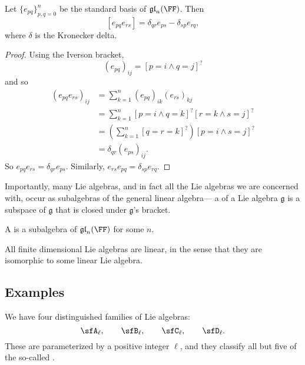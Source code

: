 \documentclass{article}
\newcommand{\lb}[1]{\ensuremath{\left[{#1}\right]}}
\newcommand{\iverson}[1]{\ensuremath{\left[{#1}\right]^?}}
\newcommand{\frkg}{{\ensuremath{\mathfrak{g}}}}
\newcommand{\glalg}{\ensuremath{\mathfrak{gl}}}
\begin{document}
\begin{proposition}
    Let $\{e_{pq}\}_{p,q = 0}^n$ be the standard basis of $\glalg_n(\FF)$.
    Then
    \[
        \lb{e_{pq}e_{rs}}
        =
        \delta_{qr}e_{ps}
        -
        \delta_{sp}e_{rq},
    \]
    where $\delta$ is the Kronecker delta.
\end{proposition}

\begin{proof}
    Using the Iverson bracket,
    \[
        (e_{pq})_{ij}
        =
        \iverson{p=i \wedge q=j}
    \]
    and so
    \begin{align*}
        (e_{pq}e_{rs})_{ij}
        &=
        \sum_{k=1}^n
        (e_{pq})_{ik}
        (e_{rs})_{kj}
        \\
        &=
        \sum_{k=1}^n
        \iverson{p=i \wedge q=k}
        \iverson{r=k \wedge s=j}
        \\
        &=
        \left(
            \sum_{k=1}^n
            \iverson{q=r=k}
        \right)
        \iverson{p=i \wedge s=j}
        \\
        &=
        \delta_{qr}
        (e_{ps})_{ij}.
    \end{align*}
    So $e_{pq}e_{rs} = \delta_{qr}e_{ps}$. 
    Similarly,
    $e_{rs}e_{pq} = \delta_{sp}e_{rq}$.
\end{proof}

Importantly, many Lie algebras, and in fact all the Lie algebras we are concerned with, occur as subalgebras of the general linear algebra--- a  of a Lie algebra $\frkg$ is a subspace of $\frkg$ that is closed under $\frkg$'s bracket.

\begin{definition}
    A  is a subalgebra of $\glalg_n(\FF)$ for some $n$.
\end{definition}

All finite dimensional Lie algebras are linear, in the sense that they are isomorphic to some linear Lie algebra.

\subsection{Examples}

We have four distinguished families of Lie algebras:
\[
    \sfA_\ell,\qquad
    \sfB_\ell,\qquad
    \sfC_\ell,\qquad
    \sfD_\ell.
\]
These are parameterized by a positive integer $\ell$, and they classify all but five of the so-called .
\end{document}
